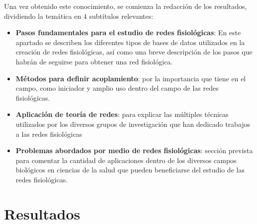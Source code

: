 \documentclass[twoside,twocolumn]{article}
\begin{document}
Una vez obtenido este conocimiento, se comienza la redacción de los resultados, dividiendo la temática en 4 subtítulos relevantes:
\begin{itemize}
  \item \textbf{Pasos fundamentales para el estudio de redes fisiológicas}: En este apartado se describen los diferentes tipos de bases de datos utilizados en la creación de redes fisiológicas, así como una breve descripción de los pasos que habrán de seguirse para obtener una red fisiológica.
  \item \textbf{Métodos para definir acoplamiento}: por la importancia que tiene en el campo, como iniciador y amplio uso dentro del campo de las redes fisiológicas.
  \item \textbf{Aplicación de teoría de redes}: para explicar las múltiples técnicas utilizados por los diversos grupos de investigación que han dedicado trabajos a las redes fisiológicas
  \item \textbf{Problemas abordados por medio de redes fisiológicas}: sección prevista para comentar la cantidad de aplicaciones dentro de los diversos campos biológicos en ciencias de la salud que pueden beneficiarse del estudio de las redes fisiológicas.
\end{itemize}


\section{Resultados}
\end{document}

